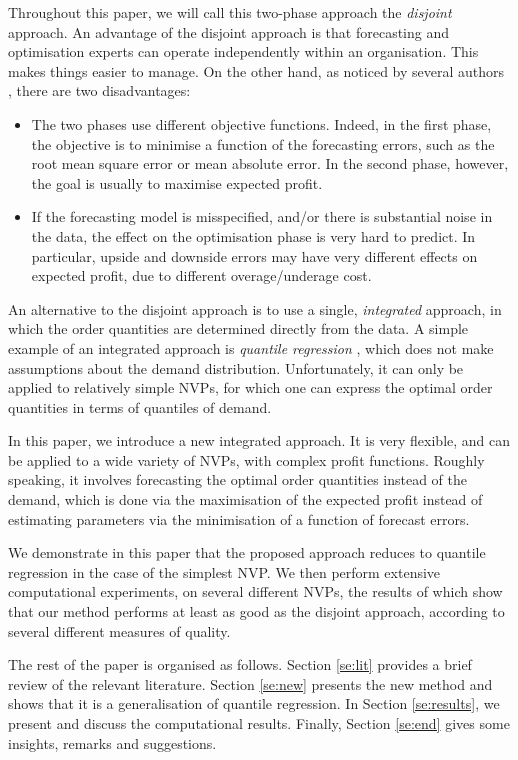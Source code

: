 \documentclass{article}
\begin{document}
Throughout this paper, we will call this two-phase approach the \emph{disjoint} approach. An advantage of the disjoint approach is that forecasting and optimisation experts can operate independently within an organisation. This makes things easier to manage. On the other hand, as noticed by several authors \cite{BT06,BM12,Ka94,KT96,KTB20}, there are two disadvantages:
\begin{itemize}
\item The two phases use different objective functions. Indeed, in the first phase, the objective is to minimise a function of the forecasting errors, such as the root mean square error or mean absolute error. In the second phase, however, the goal is usually to maximise expected profit.
\item If the forecasting model is misspecified, and/or there is substantial noise in the data, the effect on the optimisation phase is very hard to predict. In particular, upside and downside errors may have very different effects on expected profit, due to different overage/underage cost.
\end{itemize}

An alternative to the disjoint approach is to use a single, \textit{integrated} approach, in which the order quantities are determined directly from the data. A simple example of an integrated approach is \emph{quantile regression} \cite{Br16,Hu19}, which does not make assumptions about the demand distribution. Unfortunately, it can only be applied to relatively simple NVPs, for which one can express the optimal order quantities in terms of quantiles of demand.

In this paper, we introduce a new integrated approach. It is very flexible, and can be applied to a wide variety of NVPs, with complex profit functions. Roughly speaking, it involves forecasting the optimal order quantities instead of the demand, which is done via the maximisation of the expected profit instead of estimating parameters via the minimisation of a function of forecast errors.

We demonstrate in this paper that the proposed approach reduces to quantile regression in the case of the simplest NVP. We then perform extensive computational experiments, on several different NVPs, the results of which show that our method performs at least as good as the disjoint approach, according to several different measures of quality.

The rest of the paper is organised as follows. Section \ref{se:lit} provides a brief review of the relevant literature. Section \ref{se:new} presents the new method and shows that it is a generalisation of quantile regression. In Section \ref{se:results}, we present and discuss the computational results. Finally, Section \ref{se:end} gives some insights, remarks and suggestions.
\end{document}
